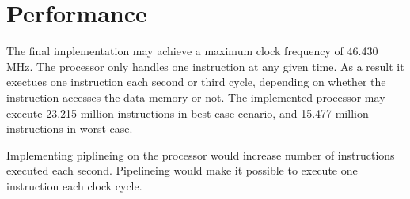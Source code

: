\section{Performance}
The final implementation may achieve a maximum clock frequency of 46.430 MHz.
The processor only handles one instruction at any given time.
As a result it exectues one instruction each second or third cycle, depending on whether the instruction accesses the data memory or not.
The implemented processor may execute 23.215 million instructions in best case cenario, and 15.477 million instructions in worst case.

Implementing piplineing on the processor would increase number of instructions executed each second.
Pipelineing would make it possible to execute one instruction each clock cycle.
